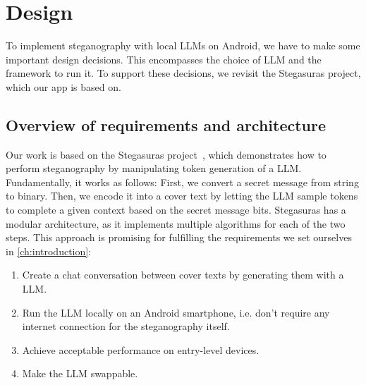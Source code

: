 
\chapter{Design}\label{ch:design}
\glsresetall %

To implement steganography with local \glspl{LLM} on Android, we have to make some important design decisions. This encompasses the choice of \gls{LLM} and the framework to run it. To support these decisions, we revisit the Stegasuras project, which our app is based on.

\section{Overview of requirements and architecture}
\label{sec:overviewOfRequirementsAndArchitecture}
Our work is based on the Stegasuras project~\cite{zieglerNeuralLinguisticSteganography2019}, which demonstrates how to perform steganography by manipulating token generation of a \gls{LLM}. Fundamentally, it works as follows: First, we convert a secret message from string to binary. Then, we encode it into a cover text by letting the \gls{LLM} sample tokens to complete a given context based on the secret message bits. Stegasuras has a modular architecture, as it implements multiple algorithms for each of the two steps. This approach is promising for fulfilling the requirements we set ourselves in \cref{ch:introduction}:
\begin{enumerate}
    \item Create a chat conversation between cover texts by generating them with a \gls{LLM}.
    \item Run the \gls{LLM} locally on an Android smartphone, i.e. don't require any internet connection for the steganography itself.
    \item Achieve acceptable performance on entry-level devices.
    \item Make the \gls{LLM} swappable.
\end{enumerate}

